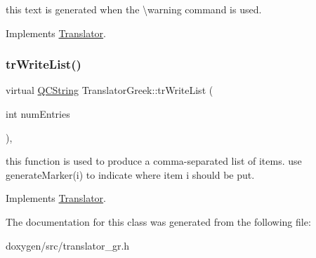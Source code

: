 this text is generated when the \textbackslash{}warning command is used. 

Implements \mbox{\hyperlink{class_translator}{Translator}}.

\mbox{\label{class_translator_greek_afb975a900ede5cf426effbd69025ba9a}} 
\subsubsection{\texorpdfstring{trWriteList()}{trWriteList()}}
{\footnotesize\ttfamily virtual \mbox{\hyperlink{class_q_c_string}{Q\+C\+String}} Translator\+Greek\+::tr\+Write\+List (\begin{DoxyParamCaption}\item[{int}]{num\+Entries }\end{DoxyParamCaption})\hspace{0.3cm}{\ttfamily [inline]}, {\ttfamily [virtual]}}

this function is used to produce a comma-\/separated list of items. use generate\+Marker(i) to indicate where item i should be put. 

Implements \mbox{\hyperlink{class_translator}{Translator}}.



The documentation for this class was generated from the following file\+:\begin{DoxyCompactItemize}
\item 
doxygen/src/translator\+\_\+gr.\+h\end{DoxyCompactItemize}

